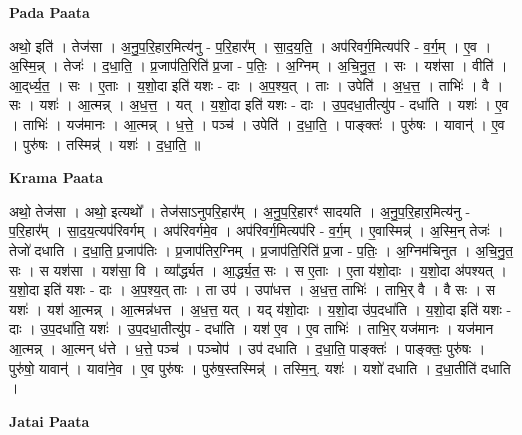 \documentclass[17pt]{extarticle}
\begin{document}
\textbf{Pada Paata} \newline

अथो॒ इति॑ । तेज॑सा । अ॒नु॒प॒रि॒हार॒मित्य॑नु - प॒रि॒हार᳚म् । सा॒द॒य॒ति॒ । अप॑रिवर्ग॒मित्यप॑रि - व॒र्ग॒म् । ए॒व । अ॒स्मि॒न्न् । तेजः॑ । द॒धा॒ति॒ । प्र॒जाप॑ति॒रिति॑ प्र॒जा - प॒तिः॒ । अ॒ग्निम् । अ॒चि॒नु॒त॒ । सः । यश॑सा । वीति॑ । आ॒द्‌र्ध्य॒त॒ । सः । ए॒ताः । य॒शो॒दा इति॑ यशः - दाः । अ॒प॒श्य॒त् । ताः । उपेति॑ । अ॒ध॒त्त॒ । ताभिः॑ । वै । सः । यशः॑ । आ॒त्मन्न् । अ॒ध॒त्त॒ । यत् । य॒शो॒दा इति॑ यशः - दाः । उ॒प॒दधा॒तीत्यु॑प - दधा॑ति । यशः॑ । ए॒व । ताभिः॑ । यज॑मानः । आ॒त्मन्न् । ध॒त्ते॒ । पञ्च॑ । उपेति॑ । द॒धा॒ति॒ । पाङ्क्तः॑ । पुरु॑षः । यावान्॑ । ए॒व । पुरु॑षः । तस्मिन्न्॑ । यशः॑ । द॒धा॒ति॒ ॥  \newline


\textbf{Krama Paata} \newline

अथो॒ तेज॑सा । अथो॒ इत्यथो᳚ । तेज॑साऽनुपरि॒हार᳚म् । अ॒नु॒प॒रि॒हारꣳ॑ सादयति । अ॒नु॒प॒रि॒हार॒मित्य॑नु - प॒रि॒हार᳚म् । सा॒द॒य॒त्यप॑रिवर्गम् । अप॑रिवर्गमे॒व । अप॑रिवर्ग॒मित्यप॑रि - व॒र्ग॒म् । ए॒वास्मिन्न्॑ । अ॒स्मि॒न् तेजः॑ । तेजो॑ दधाति । द॒धा॒ति॒ प्र॒जाप॑तिः । प्र॒जाप॑तिर॒ग्निम् । प्र॒जाप॑ति॒रिति॑ प्र॒जा - प॒तिः॒ । अ॒ग्निम॑चिनुत । अ॒चि॒नु॒त॒ सः । स यश॑सा । यश॑सा॒ वि । व्या᳚र्द्ध्यत । आ॒र्द्ध्य॒त॒ सः । स ए॒ताः । ए॒ता य॑शो॒दाः । य॒शो॒दा अ॑पश्यत् । य॒शो॒दा इति॑ यशः - दाः । अ॒प॒श्य॒त् ताः । ता उप॑ । उपा॑धत्त । अ॒ध॒त्त॒ ताभिः॑ । ताभि॒र् वै । वै सः । स यशः॑ । यश॑ आ॒त्मन्न् । आ॒त्मन्न॑धत्त । अ॒ध॒त्त॒ यत् । यद् य॑शो॒दाः । य॒शो॒दा उ॑प॒दधा॑ति । य॒शो॒दा इति॑ यशः - दाः । उ॒प॒दधा॑ति॒ यशः॑ । उ॒प॒दधा॒तीत्यु॑प - दधा॑ति । यश॑ ए॒व । ए॒व ताभिः॑ । ताभि॒र् यज॑मानः । यज॑मान आ॒त्मन्न् । आ॒त्मन् ध॑त्ते । ध॒त्ते॒ पञ्च॑ । पञ्चोप॑ । उप॑ दधाति । द॒धा॒ति॒ पाङ्क्तः॑ । पाङ्क्तः॒ पुरु॑षः । पुरु॑षो॒ यावान्॑ । यावा॑ने॒व । ए॒व पुरु॑षः । पुरु॑ष॒स्तस्मिन्न्॑ । तस्मि॒न्॒. यशः॑ । यशो॑ दधाति । द॒धा॒तीति॑ दधाति । \newline

\textbf{Jatai Paata} \newline
\end{document}
